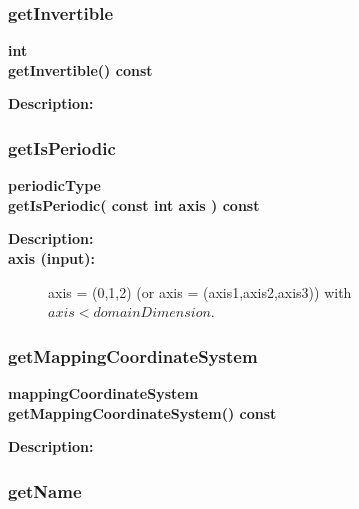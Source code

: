\subsubsection{getInvertible}
 
\begin{flushleft} \textbf{%
int  \\ 
\settowidth{\MappingIncludeArgIndent}{getInvertible(}%
getInvertible() const 
}\end{flushleft}
\begin{description}
\item[{\bf Description:}] 
\end{description}
\subsubsection{getIsPeriodic}
 
\begin{flushleft} \textbf{%
periodicType  \\ 
\settowidth{\MappingIncludeArgIndent}{getIsPeriodic(}%
getIsPeriodic( const int axis ) const
}\end{flushleft}
\begin{description}
\item[{\bf Description:}] 
\item[{\bf axis (input):}]  axis = (0,1,2) (or axis = (axis1,axis2,axis3)) with $axis<domainDimension$.
\end{description}
\subsubsection{getMappingCoordinateSystem}
 
\begin{flushleft} \textbf{%
mappingCoordinateSystem  \\ 
\settowidth{\MappingIncludeArgIndent}{getMappingCoordinateSystem(}%
getMappingCoordinateSystem() const
}\end{flushleft}
\begin{description}
\item[{\bf Description:}] 
\end{description}
\subsubsection{getName}
 
